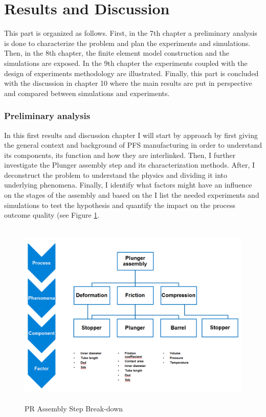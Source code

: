 \newpage
\part{Results and Discussion}
This part is organized as follows. First, in the 7th chapter a preliminary analysis is done to characterize the problem and plan the experiments and simulations. Then, in the 8th chapter, the finite element model construction and the simulations are exposed. In the 9th chapter the experiments coupled with the design of experiments methodology are illustrated. Finally, this part is concluded with the discussion in chapter 10 where the main results are put in perspective and compared between simulations and experiments.

\section{Preliminary analysis}

In this first results and discussion chapter I will start by approach by first giving the general context and background of PFS manufacturing in order to understand its components, its function and how they are interlinked. Then, I further investigate the Plunger assembly step and its characterization methods. After, I deconstruct the problem to understand the physics and dividing it into underlying phenomena. Finally, I identify what factors might have an influence on the stages of the assembly and based on the I list the needed experiments and simulations to test the hypothesis and quantify the impact on the process outcome quality (see Figure \ref{fgr:cat}.

\begin{figure}[h!]	
	\centering
\includegraphics[height=9cm]{img/category.PNG}
   \caption{PR Assembly Step Break-down}
 \label{fgr:cat}
\end{figure}

